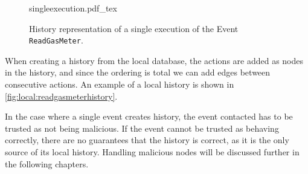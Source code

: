 	\begin{figure}
		\centering
		{singleexecution.pdf_tex}
		\caption{History representation of a single execution of the Event \texttt{ReadGasMeter}.}
		\label{fig:local:readgasmeterhistory}
	\end{figure}
	\newpar When creating a history from the local database, the actions are added as nodes in the history, and since the ordering is total we can add edges between consecutive actions. An example of a local history is shown in \autoref{fig:local:readgasmeterhistory}.
	
	
%	
%	
%	
%	
	\newpar In the case where a single event creates history, the event contacted has to be trusted as not being malicious. If the event cannot be trusted as behaving correctly, there are no guarantees that the history is correct, as it is the only source of its local history. Handling malicious nodes will be discussed further in the following chapters.
